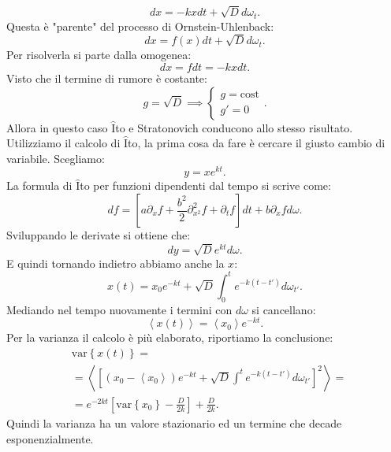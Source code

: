 \begin{exmp}[]
    \[
        dx = -kx dt + \sqrt{D} d\omega_t
    .\] 
    Questa è "parente" del processo di Ornstein-Uhlenback:
    \[
	dx = f(x) dt + \sqrt{D} d\omega_t 
    .\] 
    Per risolverla si parte dalla omogenea:
    \[
        dx = fdt = -kxdt
    .\] 
    Visto che il termine di rumore è costante:
    \[
        g = \sqrt{D} \implies  
	\begin{cases}
	    g = \text{cost}\\
	    g' = 0
	\end{cases}
    .\] 
    Allora in questo caso $\hat{\text{I}}$to e Stratonovich conducono allo stesso risultato.\\
    Utilizziamo il calcolo di $\hat{\text{I}}$to, la prima cosa da fare è cercare il giusto cambio di variabile. Scegliamo:
    \[
        y = x e^{kt}
    .\] 
    La formula di $\hat{\text{I}}$to per funzioni dipendenti dal tempo si scrive come:
    \[
        df = \left[a\partial_{x}f + \frac{b^2}{2}\partial^2_{x^2}f + \partial_{t}f\right]dt + b\partial_{x}fd\omega
    .\] 
    Sviluppando le derivate si ottiene che:
    \[
        dy = \sqrt{D} e^{kt}d\omega
    .\] 
    E quindi tornando indietro abbiamo anche la $x$:
    \[
	x(t)  = x_0 e^{-kt}+\sqrt{D} \int_{0}^{t} e^{-k(t-t')}d\omega_{t'} 
    .\] 
    Mediando nel tempo nuovamente i termini con $d\omega$ si cancellano:
    \[
	\left<x(t) \right> = \left<x_0\right>e^{-kt}
    .\] 
    Per la varianza il calcolo è più elaborato, riportiamo la conclusione:
    \[\begin{aligned}
	&\text{var}\left\{x(t) \right\} =\\ 
	& =\left<\left[(x_0-\left<x_0\right>)e^{-kt} + \sqrt{D} \int_{}^{t} e^{-k(t-t') }d\omega_{t'}\right]^2 \right> =\\
	& =e^{-2kt}\left[\text{var}\left\{x_0\right\}-\frac{D}{2k}\right]+ \frac{D}{2k}
    .\end{aligned}\]
    Quindi la varianza ha un valore stazionario ed un termine che decade esponenzialmente.
\end{exmp}
\noindent
